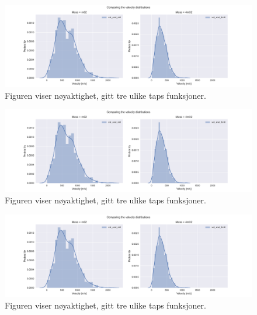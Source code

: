 \begin{escapemulticol}
\begin{figure}[ht]
    \centering
    \includegraphics[width = \textwidth]{sections/images/Comparing_distributions_for_diff_mass.pdf}
    \caption{Figuren viser nøyaktighet, gitt tre ulike taps funksjoner. }
    \label{fig:task2_}
\end{figure}

\begin{figure}[ht]
    \centering
    \includegraphics[width = \textwidth]{sections/images/Comparing_distributions_for_diff_mass.pdf}
    \caption{Figuren viser nøyaktighet, gitt tre ulike taps funksjoner. }
    \label{fig:loss}
\end{figure}

\begin{figure}[ht]
    \centering
    \includegraphics[width = \textwidth]{sections/images/Comparing_distributions_for_diff_mass.pdf}
    \caption{Figuren viser nøyaktighet, gitt tre ulike taps funksjoner. }
    \label{fig:loss}
\end{figure}

\end{escapemulticol}

